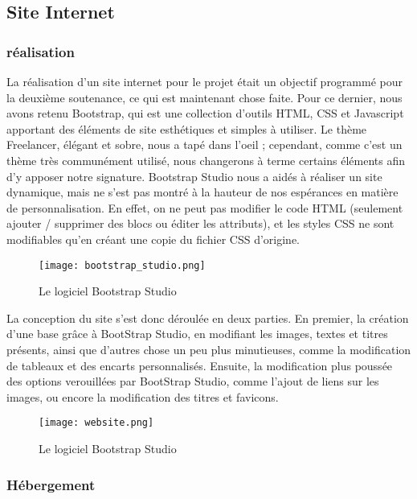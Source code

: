 \subsection{Site Internet}

    \subsubsection{réalisation}

    La réalisation d'un site internet pour le projet était un objectif
    programmé pour la deuxième soutenance, ce qui est maintenant chose faite.
    Pour ce dernier, nous avons retenu Bootstrap, qui est une collection
    d'outils HTML, CSS et Javascript apportant des éléments de site
    esthétiques et simples à utiliser. Le thème Freelancer, élégant et sobre,
    nous a tapé dans l'oeil ; cependant, comme c'est un thème très 
    communément utilisé, nous changerons à terme certains éléments afin 
    d'y apposer notre signature. Bootstrap Studio nous a aidés à réaliser
    un site dynamique, mais ne s'est pas montré à la hauteur de nos espérances
    en matière de personnalisation. En effet, on ne peut pas modifier
    le code HTML (seulement ajouter / supprimer des blocs ou éditer les
    attributs), et les styles CSS ne sont modifiables qu'en créant une copie
    du fichier CSS d'origine.

    \begin{figure}[hbt!]
        \centering
        \texttt{[image: bootstrap\_studio.png]}
        \caption{Le logiciel Bootstrap Studio}
    \end{figure}

    La conception du site s'est donc déroulée en deux parties. En premier, la création
    d'une base grâce à BootStrap Studio, en modifiant les images, textes et titres présents, ainsi
    que d'autres chose un peu plus minutieuses, comme la modification de tableaux et des encarts personnalisés.
    Ensuite, la modification plus poussée des options verouillées par BootStrap Studio, comme l'ajout de liens 
    sur les images, ou encore la modification des titres et favicons.

    \begin{figure}[hbt!]
        \centering
        \texttt{[image: website.png]}
        \caption{Le logiciel Bootstrap Studio}
    \end{figure}


    \subsubsection{Hébergement}

